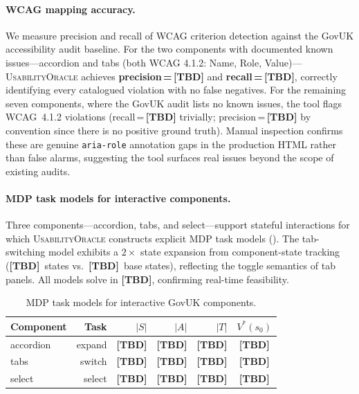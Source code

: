 \documentclass[11pt,twocolumn]{article}
\theoremstyle{definition}
\newcommand{\tool}{\textsc{UsabilityOracle}}
\begin{document}
\paragraph{WCAG mapping accuracy.}
We measure precision and recall of WCAG criterion detection against the GovUK accessibility audit baseline.
For the two components with documented known issues---accordion and tabs (both WCAG 4.1.2: Name, Role, Value)---\tool{} achieves \textbf{precision\,=\,\textbf{[TBD]}} and \textbf{recall\,=\,\textbf{[TBD]}}, correctly identifying every catalogued violation with no false negatives.
For the remaining seven components, where the GovUK audit lists no known issues, the tool flags WCAG~4.1.2 violations (recall\,=\,\textbf{[TBD]} trivially; precision\,=\,\textbf{[TBD]} by convention since there is no positive ground truth).
Manual inspection confirms these are genuine \texttt{aria-role} annotation gaps in the production HTML rather than false alarms, suggesting the tool surfaces real issues beyond the scope of existing audits.

\paragraph{MDP task models for interactive components.}
Three components---accordion, tabs, and select---support stateful interactions for which \tool{} constructs explicit MDP task models ().
The tab-switching model exhibits a $2\times$ state expansion from component-state tracking (\textbf{[TBD]}~states vs.\ \textbf{[TBD]}~base states), reflecting the toggle semantics of tab panels.
All models solve in \textbf{[TBD]}, confirming real-time feasibility.

\begin{table}[t]
\centering
\caption{MDP task models for interactive GovUK components.}
\label{tab:govuk-mdp}
\small
\begin{tabular}{@{}lrrrrc@{}}
\toprule
\textbf{Component} & \textbf{Task} & \textbf{$|S|$} & \textbf{$|A|$} & \textbf{$|T|$} & \textbf{$V^*(s_0)$} \\
\midrule
accordion & expand   &  \textbf{[TBD]} & \textbf{[TBD]} &  \textbf{[TBD]} & \textbf{[TBD]} \\
tabs      & switch   &  \textbf{[TBD]} & \textbf{[TBD]} &  \textbf{[TBD]} & \textbf{[TBD]} \\
select    & select   &  \textbf{[TBD]} & \textbf{[TBD]} &  \textbf{[TBD]} & \textbf{[TBD]} \\
\bottomrule
\end{tabular}
\end{table}
\end{document}
